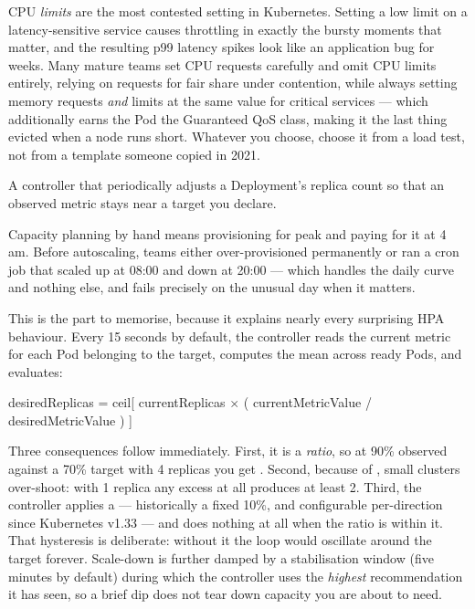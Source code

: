 \begin{perfnote}
CPU \emph{limits} are the most contested setting in Kubernetes. Setting a low limit on a latency-sensitive service causes throttling in exactly the bursty moments that matter, and the resulting p99 latency spikes look like an application bug for weeks. Many mature teams set CPU requests carefully and omit CPU limits entirely, relying on requests for fair share under contention, while always setting memory requests \emph{and} limits at the same value for critical services --- which additionally earns the Pod the Guaranteed QoS class, making it the last thing evicted when a node runs short. Whatever you choose, choose it from a load test, not from a template someone copied in 2021.
\end{perfnote}


 A controller that periodically adjusts a Deployment's replica count so that an observed metric stays near a target you declare.

 Capacity planning by hand means provisioning for peak and paying for it at 4\,am. Before autoscaling, teams either over-provisioned permanently or ran a cron job that scaled up at 08:00 and down at 20:00 --- which handles the daily curve and nothing else, and fails precisely on the unusual day when it matters.

 This is the part to memorise, because it explains nearly every surprising HPA behaviour. Every 15 seconds by default, the controller reads the current metric for each Pod belonging to the target, computes the mean across ready Pods, and evaluates:

\begin{center}\small\ttfamily
desiredReplicas = ceil[ currentReplicas $\times$ ( currentMetricValue / desiredMetricValue ) ]
\end{center}

Three consequences follow immediately. First, it is a \emph{ratio}, so at 90\% observed against a 70\% target with 4 replicas you get . Second, because of , small clusters over-shoot: with 1 replica any excess at all produces at least 2. Third, the controller applies a  --- historically a fixed 10\%, and configurable per-direction since Kubernetes v1.33 --- and does nothing at all when the ratio is within it. That hysteresis is deliberate: without it the loop would oscillate around the target forever. Scale-down is further damped by a stabilisation window (five minutes by default) during which the controller uses the \emph{highest} recommendation it has seen, so a brief dip does not tear down capacity you are about to need.


